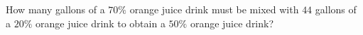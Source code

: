 How many gallons of a $70\%$ orange juice drink must be mixed with $44$ gallons of a $20\%$ orange juice drink to obtain a $50\%$ orange juice drink?
